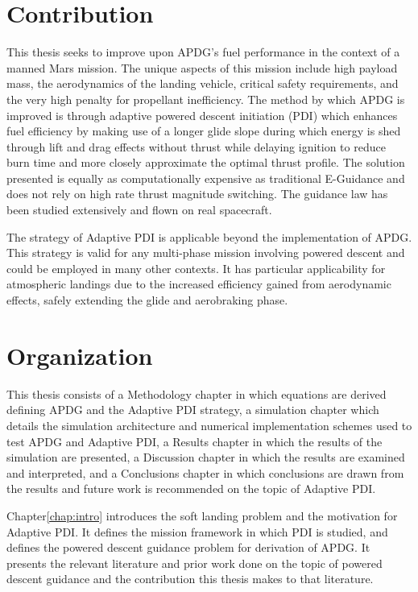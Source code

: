 \section{Contribution}
This thesis seeks to improve upon APDG's fuel performance in the context of a manned Mars mission. The unique aspects of this mission include high payload mass, the aerodynamics of the landing vehicle, critical safety requirements, and the very high penalty for propellant inefficiency. The method by which APDG is improved is through adaptive powered descent initiation (PDI) which enhances fuel efficiency by making use of a longer glide slope during which energy is shed through lift and drag effects without thrust while delaying ignition to reduce burn time and more closely approximate the optimal thrust profile. The solution presented is equally as computationally expensive as traditional E-Guidance and does not rely on high rate thrust magnitude switching. The guidance law has been studied extensively and flown on real spacecraft.

The strategy of Adaptive PDI is applicable beyond the implementation of APDG. This strategy is valid for any multi-phase mission involving powered descent and could be employed in many other contexts. It has particular applicability for atmospheric landings due to the increased efficiency gained from aerodynamic effects, safely extending the glide and aerobraking phase.

\section{Organization}
This thesis consists of a Methodology chapter in which equations are derived defining APDG and the Adaptive PDI strategy, a simulation chapter which details the simulation architecture and numerical implementation schemes used to test APDG and Adaptive PDI, a Results chapter in which the results of the simulation are presented, a Discussion chapter in which the results are examined and interpreted, and a Conclusions chapter in which conclusions are drawn from the results and future work is recommended on the topic of Adaptive PDI.

Chapter\:\ref{chap:intro} introduces the soft landing problem and the motivation for Adaptive PDI. It defines the mission framework in which PDI is studied, and defines the powered descent guidance problem for derivation of APDG. It presents the relevant literature and prior work done on the topic of powered descent guidance and the contribution this thesis makes to that literature.

